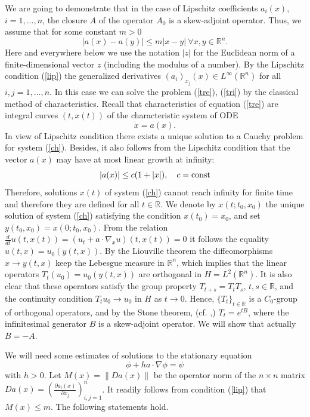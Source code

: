 \documentclass[12pt]{article}
\newcommand{\R}{{\mathbb R}}
\newcommand{\const}{{\rm const}}
\numberwithin{equation}{section}
\theoremstyle{plain}
\theoremstyle{definition}
\begin{document}
We are going to demonstrate that in the case of Lipschitz coefficients $a_i(x)$, $i=1,\ldots,n$, the closure $A$ of the operator $A_0$ is a skew-adjoint operator. Thus, we assume that for some constant $m>0$
\begin{equation}\label{lip}
|a(x)-a(y)|\le m|x-y| \ \forall x,y\in\R^n.
\end{equation}
Here and everywhere below we use the notation $|z|$ for the
Euclidean norm of a finite-dimensional vector $z$ (including the modulus of a number).
By the Lipschitz condition (\ref{lip}) the generalized derivatives
$(a_i)_{x_j}(x)\in L^\infty(\R^n)$ for all $i,j=1,\ldots,n$.
In this case we can solve the problem (\ref{tre}), (\ref{tri}) by the classical method of characteristics.
Recall that characteristics of equation (\ref{tre}) are integral curves $(t,x(t))$ of the characteristic system of ODE
\begin{equation}\label{ch}
\dot x=a(x).
\end{equation}
In view of Lipschitz condition there exists a unique solution to a Cauchy problem for system (\ref{ch}). Besides, it also follows from the Lipschitz condition that the vector $a(x)$ may have at most linear growth at infinity:
\begin{equation}\label{subl}
|a(x)|\le c(1+|x|), \quad c=\const
\end{equation}
Therefore, solutions $x(t)$ of system (\ref{ch}) cannot reach infinity for finite time and therefore they are defined for all $t\in\R$. We denote by $x(t;t_0,x_0)$ the unique solution of system (\ref{ch}) satisfying the condition $x(t_0)=x_0$, and set $y(t_0,x_0)=x(0;t_0,x_0)$. From the relation $\frac{d}{dt} u(t,x(t))=(u_t+a\cdot\nabla_x u)(t,x(t))=0$ it follows the equality $u(t,x)=u_0(y(t,x))$. By the Liouville theorem the diffeomorphisms $x\to y(t,x)$ keep the Lebesgue measure in $\R^n$, which implies that the linear operators $T_t(u_0)=u_0(y(t,x))$ are orthogonal in $H=L^2(\R^n)$. It is also clear that these operators satisfy the group property $T_{t+s}=T_tT_s$, $t,s\in\R$, and the continuity condition $T_tu_0\to u_0$ in $H$ as $t\to 0$. Hence, $\{T_t\}_{t\in\R}$ is a $C_0$-group of orthogonal operators, and by the Stone theorem, (cf.  \cite[Chapter IX]{Ios},\cite[Theorem~4.7]{Kr}) $T_t=e^{tB}$, where the infinitesimal generator $B$ is a skew-adjoint operator. We will show that actually $B=-A$.

We will need some estimates of solutions to the stationary equation
\begin{equation}
\label{tras}
\phi+ha\cdot\nabla\phi=\psi
\end{equation}
with $h>0$. Let $M(x)=\|Da(x)\|$ be the operator norm of the $n\times n$ matrix $Da(x)=\left(\frac{\partial a_i(x)}{\partial x_j}\right)_{i,j=1}^n$. It readily follows from condition (\ref{lip}) that $M(x)\le m$. The following statements hold.
\end{document}

